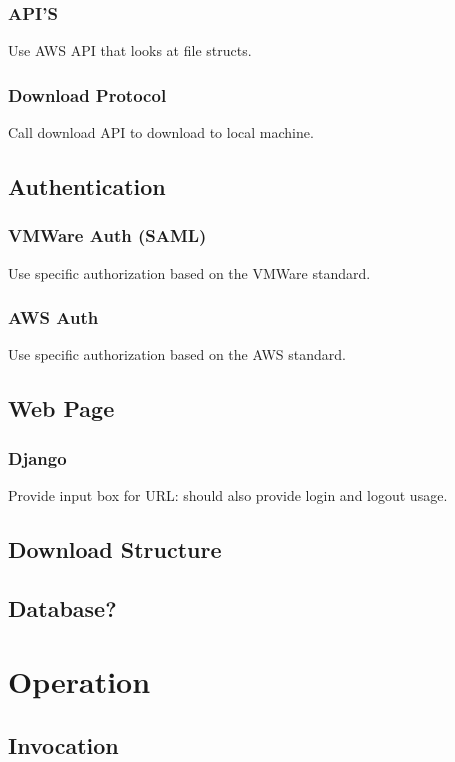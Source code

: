 \documentclass{article}
\begin{document}
            \subsubsection{API'S}
            Use AWS API that looks at file structs.

            \subsubsection{Download Protocol}
            Call download API to download to local machine.

        \subsection{Authentication}
            \subsubsection{VMWare Auth (SAML)}
            Use specific authorization based on the VMWare standard.

            \subsubsection{AWS Auth}
            Use specific authorization based on the AWS standard.

        \subsection{Web Page}
            \subsubsection{Django}
            Provide input box for URL: should also provide login and logout usage.

        \subsection{Download Structure}

        \subsection{Database?}

    \section{Operation}
        \subsection{Invocation}
\end{document}
